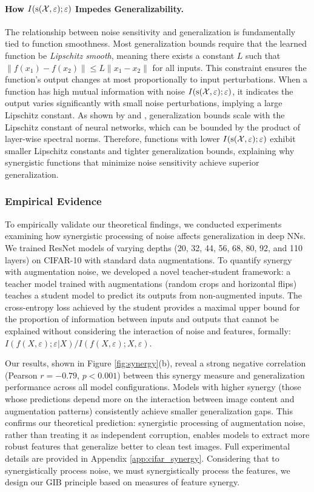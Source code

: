 \documentclass{article}
\theoremstyle{definition}
\theoremstyle{remark}
\begin{document}
\paragraph{How $I(\textup{s}(\mathcal{X},\varepsilon);\varepsilon)$ Impedes Generalizability.} 
The relationship between noise sensitivity and generalization is fundamentally tied to function smoothness. Most generalization bounds require that the learned function be \emph{Lipschitz smooth}, meaning there exists a constant $L$ such that $\|f(x_1) - f(x_2)\| \leq L\|x_1 - x_2\|$ for all inputs. This constraint ensures the function's output changes at most proportionally to input perturbations. When a function has high mutual information with noise $I(\textup{s}(\mathcal{X},\varepsilon);\varepsilon)$, it indicates the output varies significantly with small noise perturbations, implying a large Lipschitz constant. As shown by \cite{bartlett2017spectrally} and \cite{neyshabur2017exploring}, generalization bounds scale with the Lipschitz constant of neural networks, which can be bounded by the product of layer-wise spectral norms. Therefore, functions with lower $I(\textup{s}(\mathcal{X},\varepsilon);\varepsilon)$ exhibit smaller Lipschitz constants and tighter generalization bounds, explaining why synergistic functions that minimize noise sensitivity achieve superior generalization.
\subsubsection{Empirical Evidence}
To empirically validate our theoretical findings, we conducted experiments examining how synergistic processing of noise affects generalization in deep NNs. We trained ResNet models of varying depths (20, 32, 44, 56, 68, 80, 92, and 110 layers) on CIFAR-10 with standard data augmentations. To quantify synergy with augmentation noise, we developed a novel teacher-student framework: a teacher model trained with augmentations (random crops and horizontal flips) teaches a student model to predict its outputs from non-augmented inputs. The cross-entropy loss achieved by the student provides a maximal upper bound for the proportion of information between inputs and outputs that cannot be explained without considering the interaction of noise and features, formally: $I(f(X,\varepsilon); \varepsilon|X) / I(f(X,\varepsilon); X,\varepsilon)$.

Our results, shown in Figure \ref{fig:synergy}(b), reveal a strong negative correlation (Pearson $r = -0.79$, $p < 0.001$) between this synergy measure and generalization performance across all model configurations. Models with higher synergy (those whose predictions depend more on the interaction between image content and augmentation patterns) consistently achieve smaller generalization gaps. This confirms our theoretical prediction: synergistic processing of augmentation noise, rather than treating it as independent corruption, enables models to extract more robust features that generalize better to clean test images. Full experimental details are provided in Appendix \ref{app:cifar_synergy}. Considering that to synergistically process noise, we must synergistically process the features, we design our GIB principle based on measures of feature synergy.
\end{document}
